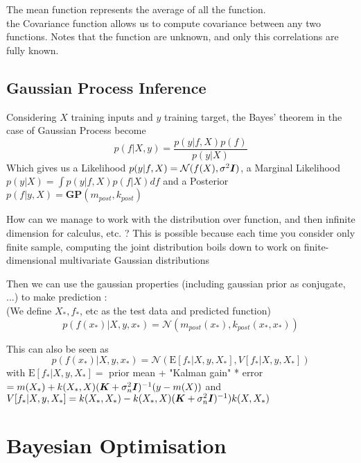 			The mean function represents the average of all the function.\\
			the Covariance function allows us to compute covariance between any two functions. Notes that the function are unknown, and only this correlations are fully known.

		\subsection{Gaussian Process Inference} %
		\label{sub:gaussian_process_inference}
				
			Considering $X$ training inputs and $y$ training target, the Bayes' theorem in the case of Gaussian Process become 
			\[
				p(f | X, y) = \frac{p(y | f, X)p(f)}{p(y | X)}
			\]
			Which gives us a Likelihood $p(y | f, X) = \mathcal{N}(f(X), \sigma^2 {\boldsymbol{{I}}})$, a Marginal Likelihood $p(y | X) = \int p(y | f, X) p (f | X) df$ and a Posterior $p(f |y, X) = \textbf{GP}(m_{post}, k_{post})$

			How can we manage to work with the distribution over function, and then infinite dimension for calculus, etc. ? This is possible because each time you consider only finite sample, computing the joint distribution boils down to work on finite-dimensional multivariate Gaussian distributions

			Then we can use the gaussian properties (including gaussian prior as conjugate, ...) to make prediction : \\
			(We define $X_*, f_*$, etc as the test data and predicted function)
			\[
				p(f(x_*) | X, y, x_*) = \mathcal{N}(m_{post}(x_*), k_{post}(x_*, x_*))
			\]

			This can also be seen as 
			\[
				p(f(x_*) | X, y, x_*) = \mathcal{N}(\text{E}{[f_* | X, y, X_*]}, V{[f_* | X, y, X_*]})
			\]
			with $\text{E}[f_* | X, y, X_*] =$ prior mean + "Kalman gain" * error $= m(X_*) + k(X_*, X)({\boldsymbol{{K}}} + \sigma^2_n {\boldsymbol{{I}}})^{-1}(y-m(X))$ and $V [f_* | X, y, X_*] = k(X_*, X_*) - k(X_*, X)({\boldsymbol{{K}}} + \sigma^2_n {\boldsymbol{{I}}})^{-1})k(X, X_*)$


		\section{Bayesian Optimisation}
